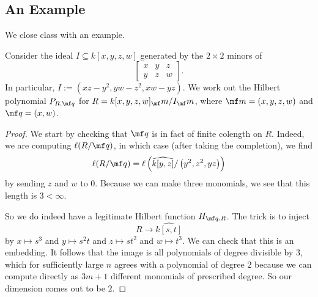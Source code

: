 \subsection{An Example}
We close class with an example.
\begin{exe}[Eisenbud 12.2]
	Consider the ideal $I\subseteq k[x,y,z,w]$ generated by the $2\times 2$ minors of
	\[\begin{bmatrix}
		x & y & z \\
		y & z & w
	\end{bmatrix}.\]
	In particular, $I:=\left(xz-y^2,yw-z^2,xw-yz\right)$. We work out the Hilbert polynomial $P_{R,\mf q}$ for $R=k[x,y,z,w]_\mf m/I_\mf m$, where $\mf m=(x,y,z,w)$ and $\mf q=(x,w)$.
\end{exe}
\begin{proof}
	We start by checking that $\mf q$ is in fact of finite colength on $R$. Indeed, we are computing $\ell(R/\mf q)$, in which case (after taking the completion), we find
	\[\ell(R/\mf q)=\ell\left(\widehat{k[y,z]}/\left(y^2,z^2,yz\right)\right)\]
	by sending $z$ and $w$ to $0$. Because we can make three monomials, we see that this length is $3<\infty$.

	So we do indeed have a legitimate Hilbert function $H_{\mf q,R}$. The trick is to inject
	\[R\to\widehat{k[s,t]}\]
	by $x\mapsto s^3$ and $y\mapsto s^2t$ and $z\mapsto st^2$ and $w\mapsto t^3$. We can check that this is an embedding. It follows that the image is all polynomials of degree divisible by $3$, which for sufficiently large $n$ agrees with a polynomial of degree $2$ because we can compute directly as $3m+1$ different monomials of prescribed degree. So our dimension comes out to be $\boxed2$.
\end{proof}